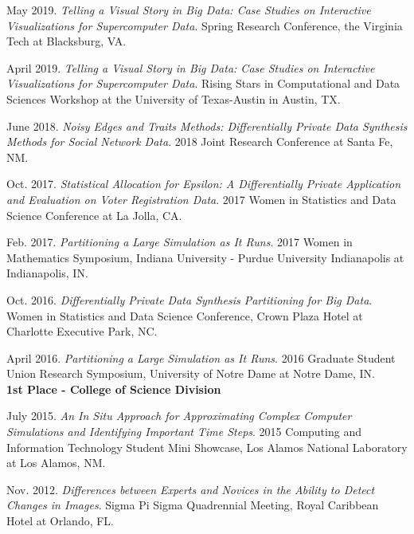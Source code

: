 \documentclass[11pt, letterpaper, roman]{moderncv} %
\begin{document}
\begin{etaremune}[topsep=0pt, itemsep=6pt, partopsep=0pt, parsep=0pt]
  \item May 2019. \textit{Telling a Visual Story in Big Data: Case Studies on Interactive Visualizations for Supercomputer Data}. Spring Research Conference, the Virginia Tech at Blacksburg, VA.

  \item April 2019. \textit{Telling a Visual Story in Big Data: Case Studies on Interactive Visualizations for Supercomputer Data}. Rising Stars in Computational and Data Sciences Workshop at the University of Texas-Austin in Austin, TX.
  
  \item June 2018. \textit{Noisy Edges and Traits Methods: Differentially Private Data Synthesis Methods for Social Network Data}. 2018 Joint Research Conference at Santa Fe, NM.
  
  \item Oct. 2017. \textit{Statistical Allocation for Epsilon: A Differentially Private Application and Evaluation on Voter Registration Data}. 2017 Women in Statistics and Data Science Conference at La Jolla, CA.
  
  \item Feb. 2017. \textit{Partitioning a Large Simulation as It Runs}. 2017 Women in Mathematics Symposium, Indiana University - Purdue University Indianapolis at Indianapolis, IN.

  \item Oct. 2016. \textit{Differentially Private Data Synthesis Partitioning for Big Data}. Women in Statistics and Data Science Conference, Crown Plaza Hotel at Charlotte Executive Park, NC. 

  \item April 2016. \textit{Partitioning a Large Simulation as It Runs}. 2016 Graduate Student Union Research Symposium, University of Notre Dame at Notre Dame, IN.\\
  \textbf{1st Place - College of Science Division}

  \item July 2015. \textit{An In Situ Approach for Approximating Complex Computer Simulations and Identifying Important Time Steps}. 2015 Computing and Information Technology Student Mini Showcase, Los Alamos National Laboratory at Los Alamos, NM.

  \item Nov. 2012. \textit{Differences between Experts and Novices in the Ability to Detect Changes in Images}. Sigma Pi Sigma Quadrennial Meeting, Royal Caribbean Hotel at Orlando, FL.


\end{etaremune}
\end{document}
